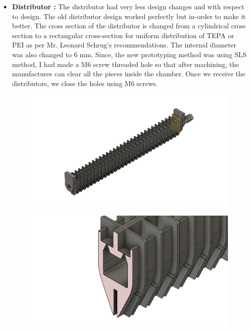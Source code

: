 \begin{itemize}
        \item \textbf{Distributor :} The distributor had very less design changes and with respect to design. The old distributor design worked perfectly but in-order to make it better. The cross section of the distributor is changed from a cylindrical cross section to a rectangular cross-section for uniform distribution of TEPA or PEI as per Mr. Leonard Schrug's recommendations. The internal diameter was also changed to 6 mm. Since, the new prototyping method was using SLS method, I had made a M6 screw threaded hole so that after machining, the manufactures can clear all the pieces inside the chamber. Once we receive the distributors, we close the holes using M6 screws. 
        
        \begin{figure}[H]
        \centering
        \begin{minipage}{.5\textwidth}
        \centering
        \includegraphics[width=\linewidth]{images/mywork/Sprint4/Distributor_main.png}
         \label{fig:2dis}
    \end{minipage}%
    \begin{minipage}{.5\textwidth}
        \centering
        \includegraphics[width=\linewidth]{images/mywork/Sprint4/newdiscross.png}
        \label{fig:2discross}
    \end{minipage}
    \end{figure}
    

\end{itemize}
